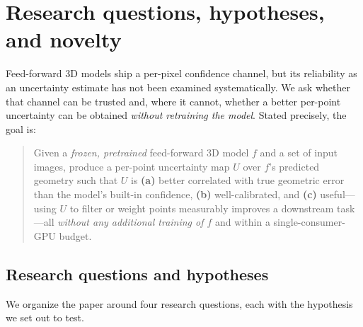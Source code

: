 \section{Research questions, hypotheses, and novelty}
\label{sec:questions}

Feed-forward 3D models ship a per-pixel confidence channel, but its reliability as an uncertainty
estimate has not been examined systematically. We ask whether that channel can be trusted and, where
it cannot, whether a better per-point uncertainty can be obtained \emph{without retraining the model}.
Stated precisely, the goal is:

\begin{quote}
Given a \emph{frozen, pretrained} feed-forward 3D model $f$ and a set of input images, produce a
per-point uncertainty map $U$ over $f$'s predicted geometry such that $U$ is \textbf{(a)} better
correlated with true geometric error than the model's built-in confidence, \textbf{(b)}
well-calibrated, and \textbf{(c)} useful---using $U$ to filter or weight points measurably improves
a downstream task---all \emph{without any additional training of $f$} and within a
single-consumer-GPU budget.
\end{quote}

\subsection{Research questions and hypotheses}
\label{sec:rqs}

We organize the paper around four research questions, each with the hypothesis we set out to test.

